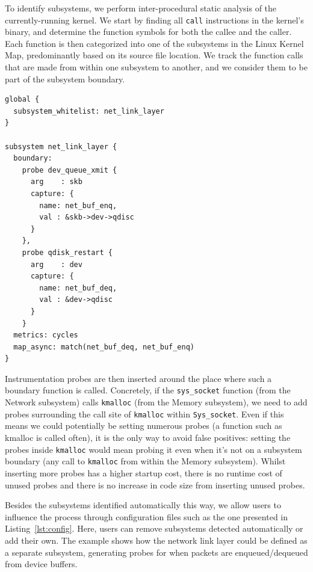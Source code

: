 \documentclass[letterpaper,twocolumn,10pt]{article}
\begin{document}
To identify subsystems, we perform inter-procedural static analysis of the
currently-running kernel. We start by finding all \texttt{call} instructions in
the kernel's binary, and determine the function symbols for both the callee and
the caller. Each function is then categorized into one of the subsystems in the
Linux Kernel Map, predominantly based on its source file location. We track the
function calls that are made from within one subsystem to another, and we
consider them to be part of the subsystem boundary.

\vspace{1em}
\lstset{style=customc, captionpos=b}
\begin{lstlisting}[caption={Sample configuration file defining a custom subsystem},label={lst:config}]
global {
  subsystem_whitelist: net_link_layer
}

subsystem net_link_layer {
  boundary:
    probe dev_queue_xmit {
      arg    : skb
      capture: {
        name: net_buf_enq,
        val : &skb->dev->qdisc
      }
    },
    probe qdisk_restart {
      arg    : dev
      capture: {
        name: net_buf_deq,
        val : &dev->qdisc
      }
    }
  metrics: cycles
  map_async: match(net_buf_deq, net_buf_enq)
}
\end{lstlisting}

Instrumentation probes are then inserted around the place where such a boundary
function is called. Concretely, if the \texttt{sys\_socket} function (from the
Network subsystem) calls \texttt{kmalloc} (from the Memory subsystem), we need
to add probes surrounding the call site of \texttt{kmalloc} within
\texttt{Sys\_socket}. Even if this means we could potentially be setting
numerous probes (a function such as kmalloc is called often), it is the
only way to avoid false positives: setting the probes inside \texttt{kmalloc}
would mean probing it even when it's not on a subsystem boundary (any call to
\texttt{kmalloc} from within the Memory subsystem). Whilst inserting more probes
has a higher startup cost, there is no runtime cost of unused probes and there
is no increase in code size from inserting unused probes.

Besides the subsystems identified automatically this way, we allow users to
influence the process through configuration files such as the one presented in
Listing~\ref{lst:config}. Here, users can remove subsystems detected
automatically or add their own. The example shows how the network link layer
could be defined as a separate subsystem, generating probes for when packets are
enqueued/dequeued from device buffers.
\end{document}
